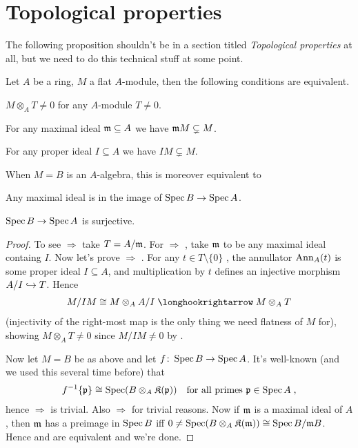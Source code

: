 \documentclass[a4paper,parskip=half,numbers=enddot, DIV=12]{scrreprt}
\begin{document}
\section{Topological properties}
The following proposition shouldn't be in a section titled \emph{Topological properties} at all, but we need to do this technical stuff at some point.
\begin{prop}
	Let $A$ be a ring, $M$ a flat $A$-module, then the following conditions are equivalent.
	\begin{alphanumerate}
		\item $M\otimes_AT\neq 0$ for any $A$-module $T\neq 0$.
		\item For any maximal ideal $\mathfrak{m}\subseteq A$ we have $\mathfrak{m} M\subsetneq M$.
		\item For any proper ideal $I\subseteq A$ we have $IM\subsetneq M$.
	\end{alphanumerate}
	When $M=B$ is an $A$-algebra, this is moreover equivalent to
	\begin{alphanumerate}\setcounter{enumi}{3}
		\item Any maximal ideal is in the image of $\Spec B\morphism\Spec A$.
		\item $\Spec B\morphism\Spec A$ is surjective.
	\end{alphanumerate}
\end{prop}
\begin{proof}
	To see  $\Rightarrow$  take $T=A/\mathfrak{m}$. For  $\Rightarrow$ , take $\mathfrak{m}$ to be any maximal ideal containg $I$. Now let's prove  $\Rightarrow$ . For any $t\in T\setminus\{0\}$ , the annullator $\operatorname{Ann}_A(t)$ is some proper ideal $I\subseteq A$, and multiplication by $t$ defines an injective morphism $A/I\monomorphism T$. Hence
	\begin{align*}
		M/IM\cong M\otimes_AA/I\monomorphism M\otimes_AT
	\end{align*}
	(injectivity of the right-most map is the only thing we need flatness of $M$ for), showing $M\otimes_AT\neq 0$ since $M/IM\neq 0$ by .
	
	Now let $M=B$ be as above and let $f\colon \Spec B\morphism\Spec A$. It's well-known (and we used this several time before) that 
	\begin{align*}
		f^{-1}\{\mathfrak{p}\}\cong \operatorname{Spec} (B\otimes_A\mathfrak{K}(\mathfrak{p}))\quad\text{for all primes }\mathfrak{p}\in\operatorname{Spec} A\;,
	\end{align*}
	hence  $\Rightarrow$  is trivial. Also  $\Rightarrow$  for trivial reasons. Now if $\mathfrak{m}$ is a maximal ideal of $A$, then $\mathfrak{m}$ has a preimage in $\operatorname{Spec} B$ iff $0\neq \operatorname{Spec} (B\otimes_A\mathfrak{K}(\mathfrak{m}))\cong \operatorname{Spec} B/\mathfrak{m} B$. Hence  and  are equivalent and we're done.
\end{proof}
\end{document}
